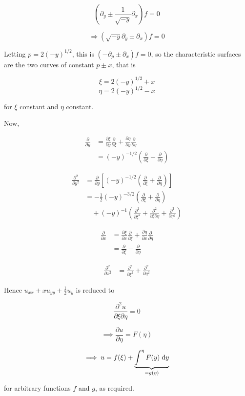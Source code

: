 \documentclass[a4paper]{article}
\begin{document}
\begin{enumerate}
	
	\[ ( \partial_{y} \pm \frac{1}{\sqrt{-y}} \partial_{x}  ) f = 0  \]
	
	\[ \Rightarrow ( \sqrt{-y} \partial_{y} \pm \partial_{x}  ) f = 0  \]
	
	 Letting $ p = 2 (-y)^{1/2} $, this is $ (- \partial_{p} \pm \partial_{x})f = 0 $, so the characteristic surfaces are the two curves of constant $ p \pm x $, that is
	
		
	\[ \xi = 2(-y)^{1/2} + x \]
	\[ \eta = 2(-y)^{1/2} - x \]
	
	for $ \xi $ constant and $ \eta $ constant.
	
	Now,
	
	\begin{align*}
	\frac{\partial }{\partial y} & = \frac{\partial \xi}{\partial y} \frac{\partial }{\partial \xi} + \frac{\partial \eta }{\partial y} \frac{\partial }{\partial \eta}    \\
	& = (-y)^{-1/2} \left( \frac{\partial }{\partial \xi} + \frac{\partial }{\partial \eta}  \right) 
	\end{align*}
	
	\begin{align*}
	\frac{\partial^{2} }{\partial y^{2}} & = \frac{\partial }{\partial y}\left[ (-y)^{-1/2} \left( \frac{\partial }{\partial \xi} + \frac{\partial }{\partial \eta}  \right) \right]   \\
	& = - \frac{1}{2} (-y)^{-3/2} \left( \frac{\partial }{\partial \xi} + \frac{\partial }{\partial \eta}  \right) \\
	& \quad  + (-y)^{-1} \left(   \frac{\partial^{2} }{\partial \xi^{2}} + \frac{\partial^{2} }{\partial \xi \partial \eta}  + \frac{\partial^{2} }{\partial \eta^{2}} \right) 
	\end{align*}
	
	\begin{align*}
	\frac{\partial }{\partial x} & = \frac{\partial \xi}{\partial x} \frac{\partial }{\partial \xi} + \frac{\partial \eta }{\partial x} \frac{\partial }{\partial \eta}    \\
	& = \frac{\partial }{\partial \xi} - \frac{\partial }{\partial \eta} 
	\end{align*}
	
	\begin{align*}
	\frac{\partial^{2} }{\partial x^{2}} & = \frac{\partial^{2} }{\partial \xi^{2}} + \frac{\partial^{2} }{\partial \eta^{2}} 
	\end{align*}
	
	Hence $ u_{xx} + xu_{yy} + \frac{1}{2} u_{y} $ is reduced to
	
	\[ \frac{\partial^{2} u}{\partial \xi \partial \eta} = 0 \]
	
	\[  \implies \frac{\partial u }{\partial \eta} = F(\eta) \]
	
	\[  \implies u = f(\xi)  +   \underbrace{\int^{\eta}  F(y) \; \mathrm{d} y}_{=g(\eta)} \]
	
	for arbitrary functions $ f $ and $ g $, as required. 
	
	 
	
\end{enumerate}
\end{document}
